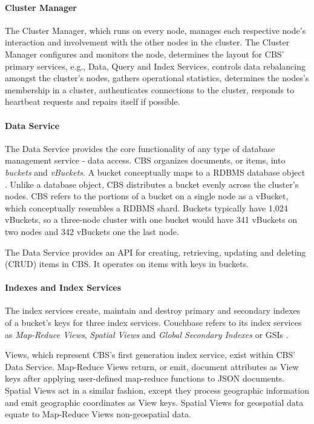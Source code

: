 \documentclass[9pt,twocolumn,twoside]{styles/osajnl}
\newcommand{\TODO}[2][]{\todo[color=red!10,inline,#1]{#2}}
\newcommand{\CE}{\TODO{Citation}}
\begin{document}
\paragraph{Cluster Manager} The Cluster Manager, which runs on every node,
manages each respective node's interaction and involvement with the other nodes
in the cluster.  The Cluster Manager configures and monitors the node,
determines the layout for CBS' primary services, e.g., Data, Query and Index
Services, controls data rebalancing amongst the cluster's nodes, gathers
operational statistics, determines the nodes's membership in a cluster,
authenticates connections to the cluster, responds to heartbeat requests and
repairs itself if possible.
\cite{www-clustermanager-cbsinc,www-components-cbsinc}

\paragraph{Data Service} The Data Service provides the core functionality of any type of database management service - data access.  CBS organizes documents, or items, into \textit{buckets} and \textit{vBuckets}.  A bucket conceptually maps to a RDBMS database object \CE.  Unlike a database object, CBS distributes a bucket evenly across the cluster's nodes.  CBS refers to the portions of a bucket on a single node as a vBucket, which conceptually resembles a RDBMS shard.  Buckets typically have 1,024 vBuckets, so a three-node cluster with one bucket would have 341 vBuckets on two nodes and 342 vBuckets one the last node.

The Data Service provides an API for creating,
retrieving, updating and deleting (CRUD) items in CBS.  It operates on items
with keys in buckets.\cite{www-architecture-cbsinc}

\paragraph{Indexes and Index Services} The index services create, maintain
and destroy primary and secondary indexes of a bucket's keys for three index
services.  Couchbase refers to its index services as \textit{Map-Reduce Views},
\textit{Spatial Views} and \textit{Global Secondary Indexes} or GSIs \CE.

Views, which represent CBS's first generation index service, exist within CBS'
Data Service.  Map-Reduce Views return, or emit, document attributes as View
keys after applying user-defined map-reduce functions to JSON documents. Spatial
Views act in a similar fashion, except they process geographic information and
emit geographic coordinates as View keys.\cite{www-queries-cbsinc}  Spatial
Views for geospatial data equate to Map-Reduce Views non-geospatial data.
\end{document}
